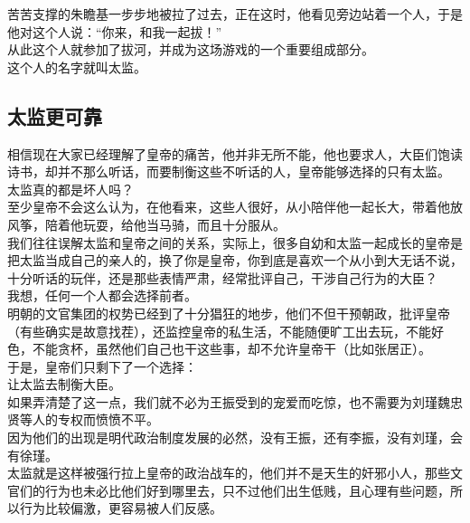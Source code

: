 \begin{multicols}{\theparacolNo}
苦苦支撑的朱瞻基一步步地被拉了过去，正在这时，他看见旁边站着一个人，于是他对这个人说：“你来，和我一起拔！”\\

从此这个人就参加了拔河，并成为这场游戏的一个重要组成部分。\\

这个人的名字就叫太监。\\

\subsection{太监更可靠}
相信现在大家已经理解了皇帝的痛苦，他并非无所不能，他也要求人，大臣们饱读诗书，却并不那么听话，而要制衡这些不听话的人，皇帝能够选择的只有太监。\\

太监真的都是坏人吗？\\

至少皇帝不会这么认为，在他看来，这些人很好，从小陪伴他一起长大，带着他放风筝，陪着他玩耍，给他当马骑，而且十分服从。\\

我们往往误解太监和皇帝之间的关系，实际上，很多自幼和太监一起成长的皇帝是把太监当成自己的亲人的，换了你是皇帝，你到底是喜欢一个从小到大无话不说，十分听话的玩伴，还是那些表情严肃，经常批评自己，干涉自己行为的大臣？\\

我想，任何一个人都会选择前者。\\

明朝的文官集团的权势已经到了十分猖狂的地步，他们不但干预朝政，批评皇帝（有些确实是故意找茬），还监控皇帝的私生活，不能随便旷工出去玩，不能好色，不能贪杯，虽然他们自己也干这些事，却不允许皇帝干（比如张居正）。\\

于是，皇帝们只剩下了一个选择：\\

让太监去制衡大臣。\\

如果弄清楚了这一点，我们就不必为王振受到的宠爱而吃惊，也不需要为刘瑾魏忠贤等人的专权而愤愤不平。\\

因为他们的出现是明代政治制度发展的必然，没有王振，还有李振，没有刘瑾，会有徐瑾。\\

太监就是这样被强行拉上皇帝的政治战车的，他们并不是天生的奸邪小人，那些文官们的行为也未必比他们好到哪里去，只不过他们出生低贱，且心理有些问题，所以行为比较偏激，更容易被人们反感。\\


\end{multicols}
